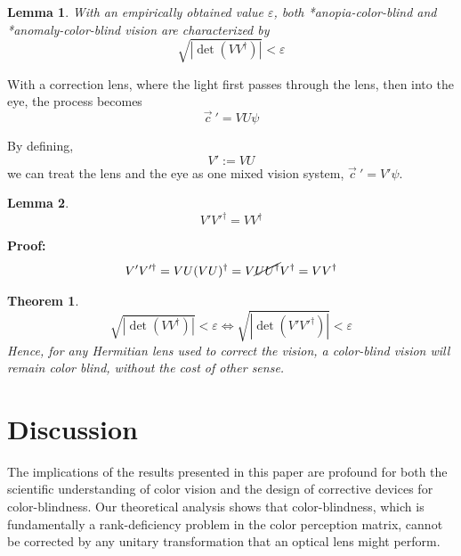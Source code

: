 \documentclass[10pt,a4paper]{article}
\newtheorem{thm}{Theorem} [section]
\newtheorem{lem}{Lemma}[section]
\theoremstyle{definition}
\theoremstyle{remark}
\numberwithin{equation}{section}
\newcommand{\abs}[1]{\left\vert#1\right\vert}
\newcommand{\eps}{\varepsilon}
\newcommand{\pdet}[1]{            \sqrt{\abs{   \det    \left(#1 #1^\dagger \right)   }}               }
\begin{document}
\begin{lem}
With an empirically obtained value $\eps$, both *anopia-color-blind and *anomaly-color-blind vision are characterized by 
\begin{equation}
\pdet{V} < \eps
\end{equation}
\end{lem}


With a correction lens, where the light first passes through the lens, then into the eye, the process becomes
\begin{equation}
\vec{c}~' = V U \psi 
\end{equation}

By defining, 
\begin{equation}
V':=VU
\end{equation}
we can treat the lens and the eye as one mixed vision system, $\vec{c}~' = V' \psi $.

\begin{lem}
\begin{equation}
V' V'^\dagger = V V^\dagger 
\end{equation}
\end{lem}
\textbf{Proof:} 
\begin{eqnarray}
V' V'^\dagger = VU (VU)^\dagger 
                      =  V \cancel{ U U^\dagger } V^\dagger 
                      =  V V^\dagger 
\end{eqnarray}

\begin{thm}
\begin{equation}
\pdet{V} < \eps \iff  \pdet{V'} < \eps
\end{equation}
Hence, for any Hermitian lens used to correct the vision, a color-blind vision will remain color blind, without the cost of other sense. 
\end{thm}

\section{Discussion}

The implications of the results presented in this paper are profound for both the scientific understanding of color vision and the design of corrective devices for color-blindness. Our theoretical analysis shows that color-blindness, which is fundamentally a rank-deficiency problem in the color perception matrix, cannot be corrected by any unitary transformation that an optical lens might perform.
\end{document}
